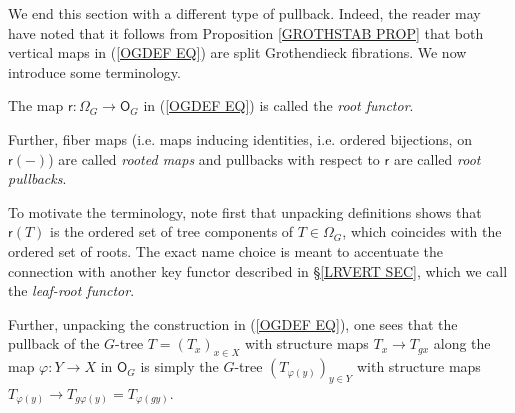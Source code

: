 \documentclass[a4paper,10pt]{article}%
\begin{document}

We end this section with a different type of pullback.
Indeed, the reader may have noted
that it follows from 
Proposition \ref{GROTHSTAB PROP}
that both vertical maps in (\ref{OGDEF EQ})
are split Grothendieck fibrations. We now introduce some terminology.

\begin{definition}\label{ROOTPULL DEF}
The map $\mathsf{r} \colon \Omega_G \to \mathsf{O}_G$
in (\ref{OGDEF EQ}) is called the \textit{root functor}.

Further, fiber maps (i.e. maps inducing identities, i.e. ordered bijections, on $\mathsf{r}(\minus)$) are called \textit{rooted maps} and pullbacks with respect to $\mathsf{r}$ are called
\textit{root pullbacks}.
\end{definition}

To motivate the terminology, 
note first that unpacking definitions shows that 
$\mathsf{r}(T)$ is the ordered set of tree components of  
$T\in \Omega_G$,
which coincides with the ordered set of roots.
The exact name choice is meant to accentuate the connection with another key functor
described in \S \ref{LRVERT SEC},
which we call the \textit{leaf-root functor}.

Further, unpacking the construction in (\ref{OGDEF EQ}), one sees that the pullback of the $G$-tree
$T = (T_x)_{x \in X}$ with structure maps $T_x \to T_{g x}$
along the map 
$\varphi \colon Y \to X$ in $\mathsf{O}_G$
is simply the $G$-tree
$(T_{\varphi(y)})_{y \in Y}$
with structure maps 
$T_{\varphi(y)} \to T_{g \varphi(y)} = T_{\varphi(g y)}$.
\end{document}
